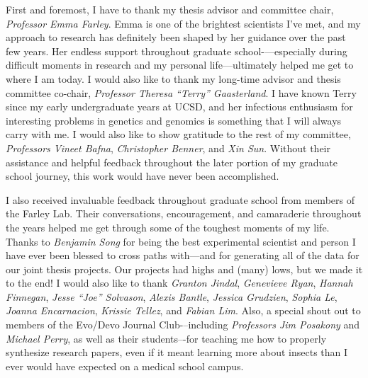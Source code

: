 \documentclass[11pt]{formatting-template}
\begin{document}

\tableofcontents
\listoffigures
\listoftables

\begin{acknowledgements}
	First and foremost, I have to thank my thesis advisor and committee chair, \textit{Professor Emma Farley}. Emma is one of the brightest scientists I’ve met, and my approach to research has definitely been shaped by her guidance over the past few years. Her endless support throughout graduate school-—especially during difficult moments in research and my personal life—ultimately helped me get to where I am today. I would also like to thank my long-time advisor and thesis committee co-chair, \textit{Professor Theresa “Terry” Gaasterland}. I have known Terry since my early undergraduate years at UCSD, and her infectious enthusiasm for interesting problems in genetics and genomics is something that I will always carry with me. I would also like to show gratitude to the rest of my committee, \textit{Professors Vineet Bafna}, \textit{Christopher Benner}, and \textit{Xin Sun}. Without their assistance and helpful feedback throughout the later portion of my graduate school journey, this work would have never been accomplished. 
	
	I also received invaluable feedback throughout graduate school from members of the Farley Lab. Their conversations, encouragement, and camaraderie throughout the years helped me get through some of the toughest moments of my life. Thanks to \textit{Benjamin Song} for being the best experimental scientist and person I have ever been blessed to cross paths with—and for generating all of the data for our joint thesis projects. Our projects had highs and (many) lows, but we made it to the end! I would also like to thank \textit{Granton Jindal}, \textit{Genevieve Ryan}, \textit{Hannah Finnegan}, \textit{Jesse “Joe” Solvason}, \textit{Alexis Bantle}, \textit{Jessica Grudzien}, \textit{Sophia Le}, \textit{Joanna Encarnacion}, \textit{Krissie Tellez}, and \textit{Fabian Lim}. Also, a special shout out to members of the Evo/Devo Journal Club-–including \textit{Professors Jim Posakony} and \textit{Michael Perry}, as well as their students–-for teaching me how to properly synthesize research papers, even if it meant learning more about insects than I ever would have expected on a medical school campus.
	

\end{acknowledgements}
\end{document}
